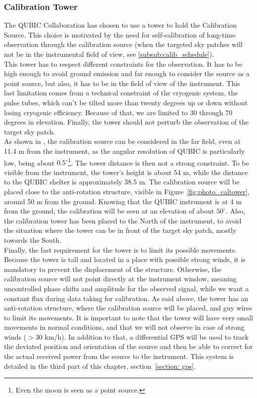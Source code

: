 \documentclass[../../thesis.tex]{subfiles}
\begin{document}
\subsubsection{Calibration Tower} \label{cal tower}
The QUBIC Collaboration has chosen to use a tower to hold the Calibration Source. This choice is motivated by the need for self-calibration of long-time observation through the calibration source (when the targeted sky patches will not be in the instrumental field of view, see \ref{subsub:calib_schedule}). \\
This tower has to respect different constraints for the observation. It has to be high enough to avoid ground emission and far enough to consider the source as a point source, but also, it has to be in the field of view of the instrument. This last limitation comes from a technical constraint of the cryogenic system, the pulse tubes, which can't be tilted more than twenty degrees up or down without losing cryogenic efficiency. Because of that, we are limited to 30 through 70 degrees in elevation. Finally, the tower should not perturb the observation of the target sky patch. \\
As shown in \cite{qubic3}, the calibration source can be considered in the far field, even at 11.4 m from the instrument, as the angular resolution of QUBIC is particularly low, being about $0.5^\circ$\footnote{Even the moon is seen as a point source.}. The tower distance is then not a strong constraint. To be visible from the instrument, the tower's height is about 54 m, while the distance to the QUBIC shelter is approximately 38.5 m. The calibration source will be placed close to the anti-rotation structure, visible in Figure~\ref{fig:photo_caltower}, around 50 m from the ground. Knowing that the QUBIC instrument is at 4 m from the ground, the calibration will be seen at an elevation of about $50^\circ$. Also, the calibration tower has been placed to the North of the instrument, to avoid the situation where the tower can be in front of the target sky patch, mostly towards the South. \\
Finally, the last requirement for the tower is to limit its possible movements. Because the tower is tall and located in a place with possible strong winds, it is mandatory to prevent the displacement of the structure. Otherwise, the calibration source will not point directly at the instrument window, meaning uncontrolled phase shifts and amplitude for the observed signal, while we want a constant flux during data taking for calibration. As said above, the tower has an anti-rotation structure, where the calibration source will be placed, and guy wires to limit its movements. It is important to note that the tower will have very small movements in normal conditions, and that we will not observe in case of strong winds ($> 30$ km/h). In addition to that, a differential GPS will be used to track the deviated position and orientation of the source and then be able to correct for the actual received power from the source to the instrument. This system is detailed in the third part of this chapter, section~\ref{section: gps}.
\end{document}
